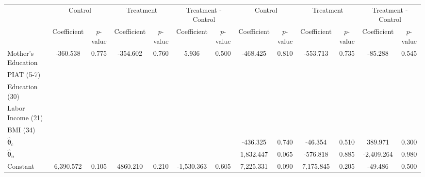 \begin{tabular}{lcccccccccccc} \toprule
&\multicolumn{2}{c}{Control} & \multicolumn{2}{c}{Treatment} & \multicolumn{2}{c}{Treatment - Control} & \multicolumn{2}{c}{Control} & \multicolumn{2}{c}{Treatment} & \multicolumn{2}{c}{Treatment - Control} \\
 & Coefficient  & $p$-value  & Coefficient  & $p$-value & Coefficient  & $p$-value  & Coefficient  & $p$-value  & Coefficient  & $p$-value  & Coefficient  & $p$-value \\ \midrule
Mother's Education  &  -360.538 &     0.775 &  -354.602 &     0.760 &     5.936 &     0.500 &  -468.425 &     0.810 &  -553.713 &     0.735 &   -85.288 &     0.545 \\  
PIAT (5-7) &         &         &         &         &         &         &         &         &         &         &         &         \\  
Education (30) &         &         &         &         &         &         &         &         &         &         &         &         \\  
Labor Income (21)  &         &         &         &         &         &         &         &         &         &         &         &         \\  
BMI (34) &         &         &         &         &         &         &         &         &         &         &         &         \\  
$\hat{\bm{\theta}}_{c}$ &         &         &         &         &         &         &  -436.325 &     0.740 &   -46.354 &     0.510 &   389.971 &     0.300 \\  
$\hat{\bm{\theta}}_{n}$ &         &         &         &         &         &         &  1,832.447 &     0.065 &  -576.818 &     0.885 & -2,409.264 &     0.980 \\  
Constant &  6,390.572 &     0.105 &  4860.210 &     0.210 & -1,530.363 &     0.605 &  7,225.331 &     0.090 &  7,175.845 &     0.205 &   -49.486 &     0.500 \\ \bottomrule \end{tabular}
